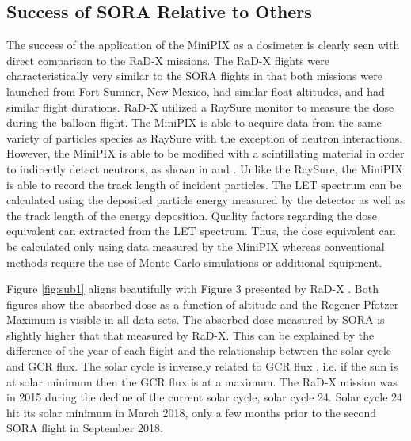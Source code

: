 


\subsection{Success of SORA Relative to Others}

The success of the application of the MiniPIX as a dosimeter is clearly seen with direct comparison to the RaD-X missions. The RaD-X flights were characteristically very similar to the SORA flights in that both missions were launched from Fort Sumner, New Mexico, had similar float altitudes, and had similar flight durations. RaD-X utilized a RaySure monitor to measure the dose during the balloon flight. The MiniPIX is able to acquire data from the same variety of particles species as RaySure with the exception of neutron interactions. However, the MiniPIX is able to be modified with a scintillating material in order to indirectly detect neutrons, as shown in \cite{medipix-neutron-scintillator-1} and \cite{medipix-neutron-scintillator-2}. Unlike the RaySure, the MiniPIX is able to record the track length of incident particles. The LET spectrum can be calculated using the deposited particle energy measured by the detector as well as the track length of the energy deposition. Quality factors regarding the dose equivalent can extracted from the LET spectrum. Thus, the dose equivalent can be calculated only using data measured by the MiniPIX whereas conventional methods require the use of Monte Carlo simulations \cite{stuartthesis} or additional equipment.   

Figure \ref{fig:sub1} aligns beautifully with Figure 3 presented by RaD-X \cite{rad-x}. Both figures show the absorbed dose as a function of altitude and the Regener-Pfotzer Maximum is visible in all data sets. The absorbed dose measured by SORA is slightly higher that that measured by RaD-X. This can be explained by the difference of the year of each flight and the relationship between the solar cycle and GCR flux. The solar cycle is inversely related to GCR flux \cite{hathaway}, i.e. if the sun is at solar minimum then the GCR flux is at a maximum. The RaD-X mission was in 2015 during the decline of the current solar cycle, solar cycle \num{24}. Solar cycle \num{24} hit its solar minimum in March 2018, only a few months prior to the second SORA flight in September 2018. 

